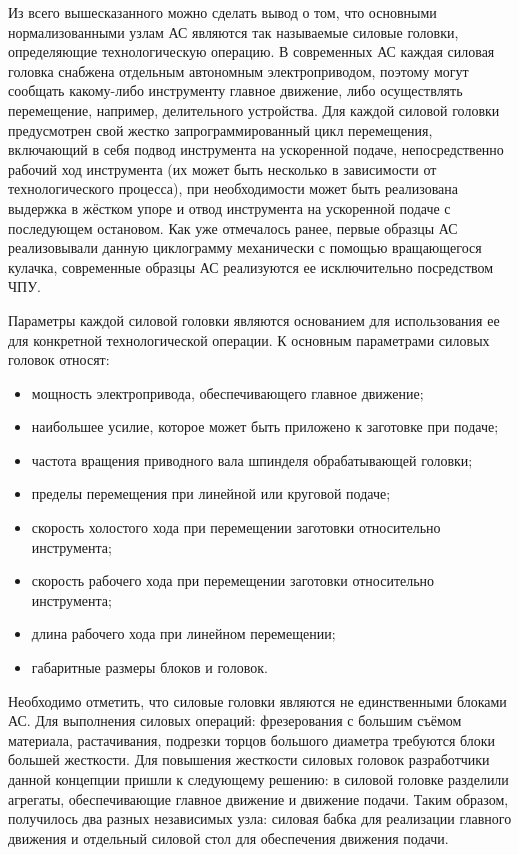 Из всего вышесказанного можно сделать вывод о том, что основными нормализованными узлам АС являются так называемые силовые головки, определяющие технологическую операцию. В современных АС каждая силовая головка снабжена отдельным автономным электроприводом, поэтому могут сообщать какому-либо инструменту главное движение, либо осуществлять перемещение, например, делительного устройства. Для каждой силовой головки предусмотрен свой жестко запрограммированный цикл перемещения, включающий в себя подвод инструмента на ускоренной подаче, непосредственно рабочий ход инструмента (их может быть несколько в зависимости от технологического процесса), при необходимости может быть реализована выдержка в жёстком упоре и отвод инструмента на ускоренной подаче с последующем остановом. Как уже отмечалось ранее, первые образцы АС реализовывали данную циклограмму механически с помощью вращающегося кулачка, современные образцы АС реализуются ее исключительно посредством ЧПУ.

Параметры каждой силовой головки являются основанием для использования ее для конкретной технологической операции. К основным параметрами силовых головок относят:

\begin{itemize}
	\item мощность электропривода, обеспечивающего главное движение;
	\item наибольшее усилие, которое может быть приложено к заготовке при подаче;
	\item частота вращения приводного вала шпинделя обрабатывающей головки;
	\item пределы перемещения при линейной или круговой подаче;
	\item скорость холостого хода при перемещении заготовки относительно инструмента;
	\item скорость рабочего хода при перемещении заготовки относительно инструмента;
	\item длина рабочего хода при линейном перемещении;
	\item габаритные размеры блоков и головок.
\end{itemize}

Необходимо отметить, что силовые головки являются не единственными блоками АС. Для выполнения силовых операций: фрезерования с большим съёмом материала, растачивания, подрезки торцов большого диаметра требуются блоки большей жесткости. Для повышения жесткости силовых головок разработчики данной концепции пришли к следующему решению: в силовой головке разделили агрегаты, обеспечивающие главное движение и движение подачи. Таким образом, получилось два разных независимых узла: силовая бабка для реализации главного движения и отдельный силовой стол для обеспечения движения подачи.  

